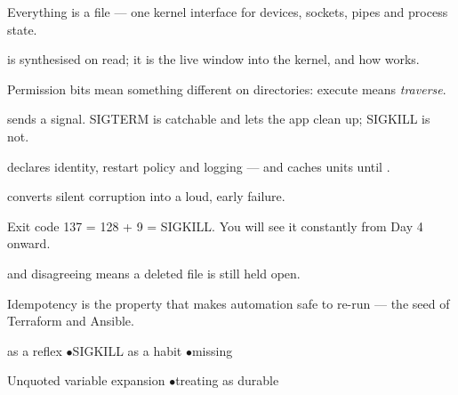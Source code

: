 \begin{tickcheck}
  \item Everything is a file --- one kernel interface for devices, sockets, pipes and process state.
  \item {} is synthesised on read; it is the live window into the kernel, and how  works.
  \item Permission bits mean something different on directories: execute means \emph{traverse}.
  \item {} sends a signal. SIGTERM is catchable and lets the app clean up; SIGKILL is not.
  \item {} declares identity, restart policy and logging --- and caches units until .
  \item {} converts silent corruption into a loud, early failure.
\end{tickcheck}

\begin{wbitem}
  \item Exit code 137 = 128 + 9 = SIGKILL. You will see it constantly from Day 4 onward.
  \item {} and  disagreeing means a deleted file is still held open.
  \item Idempotency is the property that makes automation safe to re-run --- the seed of Terraform and Ansible.
\end{wbitem}

\begin{wbitem}
  \item {} as a reflex \quad$\bullet$\quad SIGKILL as a habit \quad$\bullet$\quad missing 
  \item Unquoted variable expansion \quad$\bullet$\quad treating  as durable
\end{wbitem}

\begin{cheatsheet}
\end{cheatsheet}

